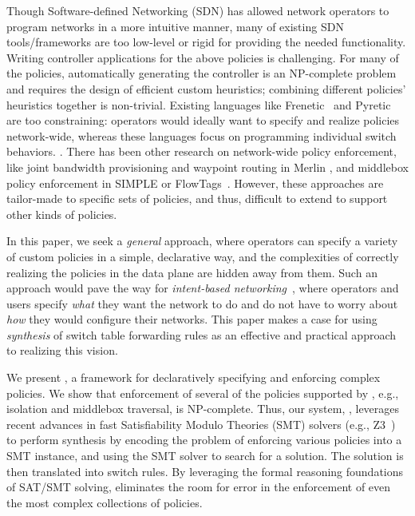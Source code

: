 Though Software-defined Networking (SDN) has allowed network operators
to program networks in a more intuitive manner, many of existing SDN
tools/frameworks are too low-level or rigid for providing the needed
functionality. Writing controller applications for the above policies
is challenging. For many of the policies, automatically generating the controller is an
NP-complete problem and requires the design of efficient custom heuristics;
combining different policies' heuristics together is
non-trivial. Existing languages like Frenetic~\cite{frenetic} and
Pyretic~\cite{pyretic} are too constraining: operators would ideally
want to specify and realize policies network-wide, whereas these
languages focus on programming individual switch behaviors. .  There has been other research on
network-wide policy enforcement, like joint bandwidth provisioning and
waypoint routing in Merlin \cite{Merlin}, and middlebox policy
enforcement in SIMPLE \cite{simple} or
FlowTags~\cite{flowtags}. However, these approaches are tailor-made to
specific sets of policies, and thus, difficult to extend to support
other kinds of policies.

In this paper, we seek a {\em general} approach, where operators can
specify a variety of custom policies in a simple, declarative way, and
the complexities of correctly realizing the policies in the data plane
are hidden away from them. Such an approach would pave the way for
{\em intent-based networking}~\cite{}, where operators and users
specify {\em what} they want the network to do and do not have to
worry about {\em how} they would configure their
networks. %
This paper makes a case for using \emph{synthesis} of switch table
forwarding rules as an effective and practical approach to realizing
this vision.

We present \Name, a framework for declaratively specifying and enforcing 
complex policies.
We show that enforcement of several of the policies supported by
\Name, e.g., isolation and middlebox traversal, is NP-complete. Thus,
our system, \Name, leverages recent advances in fast Satisfiability
Modulo Theories (SMT) solvers
(e.g., Z3~\cite{z3}) to perform synthesis by encoding the problem of
enforcing various policies into a SMT instance, and using the SMT
solver to search for a solution. The solution is then translated into
switch rules. %
By leveraging the formal reasoning foundations of SAT/SMT solving,
\Name eliminates the room for error in the enforcement of even the
most complex collections of policies.

